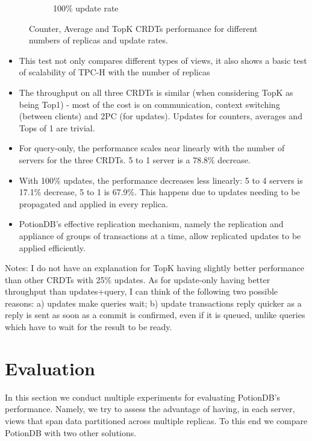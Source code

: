 \documentclass[sigplan,10pt]{acmart}
\begin{document}
\begin{figure}[h]
\begin{subfigure}{.33\linewidth}
		\caption{100\% update rate}
		\label{fig:(new)CounterAvgTopK100upd}
	\end{subfigure}
	\caption{Counter, Average and TopK CRDTs performance for different numbers of replicas and update rates.}
	\label{fig:(new)CounterAvgTopK}
\end{figure}

\begin{itemize}
	\item This test not only compares different types of views, it also shows a basic test of scalability of TPC-H with the number of replicas
	\item The throughput on all three CRDTs is similar (when considering TopK as being Top1) - most of the cost is on communication, context switching (between clients) and 2PC (for updates). Updates for counters, averages and Tops of 1 are trivial.
	\item For query-only, the performance scales near linearly with the number of servers for the three CRDTs. 5 to 1 server is a 78.8\% decrease.
	\item With 100\% updates, the performance decreases less linearly: 5 to 4 servers is 17.1\% decrease, 5 to 1 is 67.9\%. This happens due to updates needing to be propagated and applied in every replica.
	\item PotionDB's effective replication mechanism, namely the replication and appliance of groups of transactions at a time, allow replicated updates to be applied efficiently.
\end{itemize}

Notes: I do not have an explanation for TopK having slightly better performance than other CRDTs with 25\% updates.
As for update-only having better throughput than updates+query, I can think of the following two possible reasons: a) updates make queries wait; b) update transactions reply quicker as a reply is sent as soon as a commit is confirmed, even if it is queued, unlike queries which have to wait for the result to be ready.

\section{Evaluation}
\label{sec:evaluation}

In this section we conduct multiple experiments for evaluating PotionDB's performance.
Namely, we try to assess the advantage of having, in each server, views that span data partitioned across multiple replicas.
To this end we compare PotionDB with two other solutions.
\end{document}
